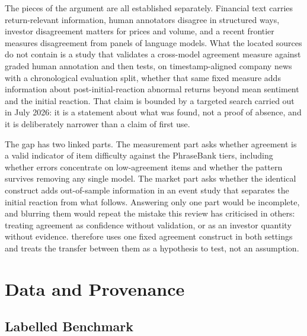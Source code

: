 \documentclass[11pt,a4paper,oneside]{book}
\newif\ifshowdraftnotes
\newcommand{\draftnote}[1]{%
  \ifshowdraftnotes
    \par\smallskip
    \noindent{\color{draftgrey}\small\itshape Drafting note: #1\par}
    \smallskip
  \fi
}
\begin{document}
The pieces of the argument are all established separately.
Financial text carries return-relevant information, human annotators disagree in structured ways, investor disagreement matters for prices and volume, and a recent frontier measures disagreement from panels of language models.
What the located sources do not contain is a study that validates a cross-model agreement measure against graded human annotation and then tests, on timestamp-aligned company news with a chronological evaluation split, whether that same fixed measure adds information about post-initial-reaction abnormal returns beyond mean sentiment and the initial reaction.
That claim is bounded by a targeted search carried out in July 2026: it is a statement about what was found, not a proof of absence, and it is deliberately narrower than a claim of first use.

The gap has two linked parts.
The measurement part asks whether agreement is a valid indicator of item difficulty against the PhraseBank tiers, including whether errors concentrate on low-agreement items and whether the pattern survives removing any single model.
The market part asks whether the identical construct adds out-of-sample information in an event study that separates the initial reaction from what follows.
Answering only one part would be incomplete, and blurring them would repeat the mistake this review has criticised in others: treating agreement as confidence without validation, or as an investor quantity without evidence.
 therefore uses one fixed agreement construct in both settings and treats the transfer between them as a hypothesis to test, not an assumption.

\draftnote{Several nearest-neighbour papers cited in \cref{sec:lit-machine-disagreement} and \cref{sec:lit-sentiment-models} are working papers or preprints with metadata still to be confirmed (Liu et al.\ 2025; Bhagwat et al.\ 2026; Zhang et al.\ 2025; Li et al.\ 2026; Sharma and Baruah 2026; Ni et al.\ 2026; Inoshita et al.\ 2026). Verify authors, venues and findings against full text and rerun forward-citation checks before submission; the corresponding \texttt{references.bib} entries are flagged with VERIFY comments.}

\chapter{Data and Provenance}
\label{ch:data}

\section{Labelled Benchmark}
\label{sec:data-benchmark}
\end{document}
